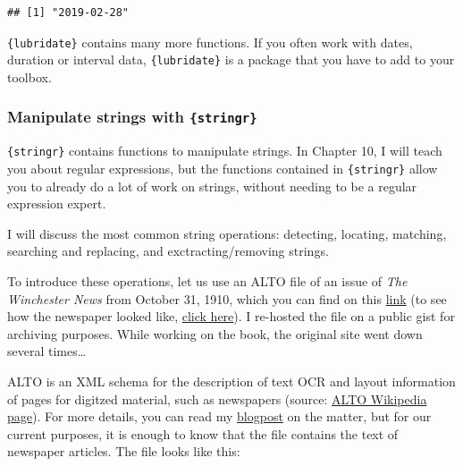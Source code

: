 \documentclass[]{gitbook}
\begin{document}
\begin{verbatim}
## [1] "2019-02-28"
\end{verbatim}

\texttt{\{lubridate\}} contains many more functions. If you often work with dates, duration or interval
data, \texttt{\{lubridate\}} is a package that you have to add to your toolbox.

\hypertarget{manipulate-strings-with-stringr}{%
\subsubsection{\texorpdfstring{Manipulate strings with \texttt{\{stringr\}}}{Manipulate strings with \{stringr\}}}\label{manipulate-strings-with-stringr}}

\texttt{\{stringr\}} contains functions to manipulate strings. In Chapter 10, I will teach you about regular
expressions, but the functions contained in \texttt{\{stringr\}} allow you to already do a lot of work on
strings, without needing to be a regular expression expert.

I will discuss the most common string operations: detecting, locating, matching, searching and
replacing, and exctracting/removing strings.

To introduce these operations, let us use an ALTO file of an issue of \emph{The Winchester News} from
October 31, 1910, which you can find on this
\href{https://gist.githubusercontent.com/b-rodrigues/5139560e7d0f2ecebe5da1df3629e015/raw/e3031d894ffb97217ddbad1ade1b307c9937d2c8/gistfile1.txt}{link} (to see
how the newspaper looked like,
\href{https://chroniclingamerica.loc.gov/lccn/sn86069133/1910-10-31/ed-1/seq-1/}{click here}). I re-hosted
the file on a public gist for archiving purposes. While working on the book, the original site went
down several times\ldots{}

ALTO is an XML schema for the description of text OCR and layout information of pages for digitzed
material, such as newspapers (source: \href{https://en.wikipedia.org/wiki/ALTO_(XML)}{ALTO Wikipedia page}).
For more details, you can read my
\href{https://www.brodrigues.co/blog/2019-01-13-newspapers_mets_alto/}{blogpost}
on the matter, but for our current purposes, it is enough to know that the file contains the text
of newspaper articles. The file looks like this:
\end{document}
